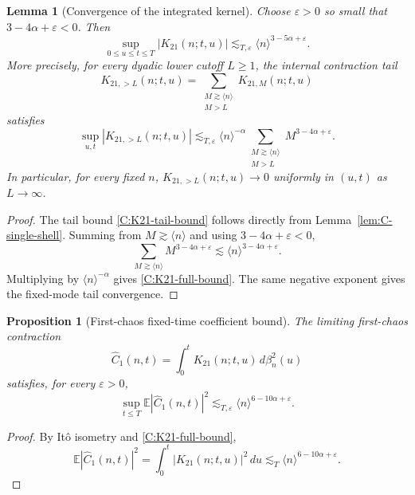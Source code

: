 \documentclass[10pt]{amsart}
\numberwithin{equation}{section}
\theoremstyle{plain}
\newtheorem{proposition}[theorem]{Proposition}
\newtheorem{lemma}[theorem]{Lemma}
\theoremstyle{definition}
\theoremstyle{remark}
\newcommand{\E}{\mathbb{E}}
\newcommand{\eps}{\varepsilon}
\newcommand{\la}{\langle}
\newcommand{\ra}{\rangle}
\newcommand{\wh}{\widehat}
\begin{document}
\begin{lemma}[Convergence of the integrated kernel]\label{lem:C-K21-conv}
Choose \(\eps>0\) so small that \(3-4\alpha+\eps<0\).  Then
\begin{equation}\label{C:K21-full-bound}
        \sup_{0\le u\le t\le T}|K_{21}(n;t,u)|
        \lesssim_{T,\eps}\la n\ra^{3-5\alpha+\eps}.
\end{equation}
More precisely, for every dyadic lower cutoff \(L\ge1\), the internal contraction tail
\[
        K_{21,>L}(n;t,u)
        =\sum_{\substack{M\gtrsim\la n\ra\\ M>L}}K_{21,M}(n;t,u)
\]
satisfies
\begin{equation}\label{C:K21-tail-bound}
        \sup_{u,t}|K_{21,>L}(n;t,u)|
        \lesssim_{T,\eps}
        \la n\ra^{-\alpha}
        \sum_{\substack{M\gtrsim\la n\ra\\ M>L}}M^{3-4\alpha+\eps}.
\end{equation}
In particular, for every fixed \(n\), \(K_{21,>L}(n;t,u)\to0\) uniformly in \((u,t)\) as \(L\to\infty\).
\end{lemma}

\begin{proof}
The tail bound \eqref{C:K21-tail-bound} follows directly from Lemma~\ref{lem:C-single-shell}.  Summing from \(M\gtrsim\la n\ra\) and using \(3-4\alpha+\eps<0\),
\[
        \sum_{M\gtrsim\la n\ra}M^{3-4\alpha+\eps}
        \lesssim \la n\ra^{3-4\alpha+\eps}.
\]
Multiplying by \(\la n\ra^{-\alpha}\) gives \eqref{C:K21-full-bound}.  The same negative exponent gives the fixed-mode tail convergence.
\end{proof}

\begin{proposition}[First-chaos fixed-time coefficient bound]\label{prop:C-first-chaos-fixed}
The limiting first-chaos contraction
\begin{equation}\label{C:C1-def}
        \wh C_1(n,t)=\int_0^tK_{21}(n;t,u)\,d\beta_n^2(u)
\end{equation}
satisfies, for every \(\eps>0\),
\begin{equation}\label{C:C1-fixed-bound}
        \sup_{t\le T}\E|\wh C_1(n,t)|^2
        \lesssim_{T,\eps}\la n\ra^{6-10\alpha+\eps}.
\end{equation}
\end{proposition}

\begin{proof}
By Itô isometry and \eqref{C:K21-full-bound},
\[
        \E|\wh C_1(n,t)|^2
        =\int_0^t|K_{21}(n;t,u)|^2\,du
        \lesssim_T \la n\ra^{6-10\alpha+\eps}.
\]
\end{proof}
\end{document}
